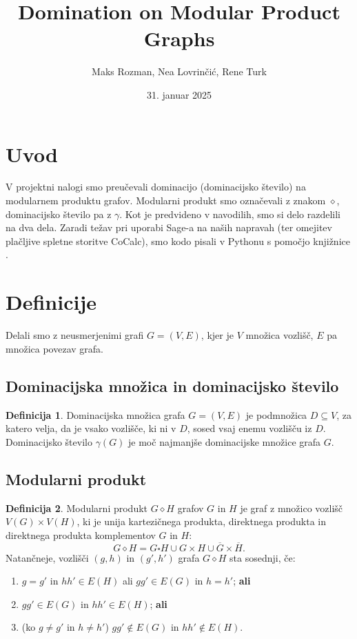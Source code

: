 \documentclass[a4paper,12pt]{article}
\title{Domination on Modular Product Graphs}
\author{
    Maks Rozman, Nea Lovrinčić, Rene Turk
}
\date{31. januar 2025}
\theoremstyle{definition}
\newtheorem{definition}{Definicija}[section]
\begin{document}
\maketitle


\section{Uvod}
V projektni nalogi smo preučevali dominacijo (dominacijsko število) na modularnem produktu grafov. Modularni produkt smo označevali z znakom $\diamond$, dominacijsko število pa z $\gamma$. Kot je predvideno v navodilih, smo si delo razdelili na dva dela. Zaradi težav pri uporabi Sage-a na naših napravah (ter omejitev plačljive spletne storitve CoCalc), smo kodo pisali v Pythonu s pomočjo knjižnice .

\section{Definicije}
Delali smo z neusmerjenimi grafi $G = (V,E)$, kjer je $V$ množica vozlišč, $E$ pa množica povezav grafa.
\subsection{Dominacijska množica in dominacijsko število}
\begin{definition}\label{def:dominacijska}
    Dominacijska množica grafa $G = (V, E)$ je podmnožica $D \subseteq V$, za katero velja, da je vsako vozlišče, ki ni v $D$, sosed vsaj enemu vozlišču iz $D$. Dominacijsko število $\gamma(G)$ je moč najmanjše dominacijske množice grafa $G$.
\end{definition}

\subsection{Modularni produkt}
\begin{definition}\label{def:modularni}
    Modularni produkt $G \diamond H$ grafov $G$ in $H$ je graf z množico vozlišč $V(G) \times V(H)$, ki je unija kartezičnega produkta, direktnega produkta in direktnega produkta komplementov $G$ in $H$:
    $$
    G \diamond H = G \square H \cup G \times H \cup \overline{G} \times \overline{H}.
    $$
    Natančneje, vozlišči $(g,h)$ in $(g',h')$ grafa $G \diamond H$ sta sosednji, če:
    \begin{enumerate}
        \item $g = g'$ in $hh' \in E(H)$ ali $gg' \in E(G)$ in $h=h'$; \textbf{ali}
        \item $gg' \in E(G)$ in $hh' \in E(H)$; \textbf{ali}
        \item (ko $g \neq g'$ in $h \neq h'$) $gg'\notin E(G)$ in $hh' \notin E(H)$.
    \end{enumerate}
\end{definition}  
\end{document}
